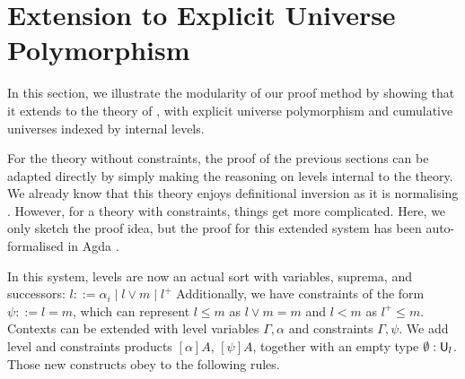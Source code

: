 \section{Extension to Explicit Universe Polymorphism}\label{extension}

In this section, we illustrate the modularity of our proof method by showing that it extends to the theory of \citet{polymorphism, bcde2026}, with explicit universe polymorphism and cumulative universes indexed by internal levels.

For the theory without constraints, the proof of the previous sections can be adapted directly by simply making the reasoning on levels internal to the theory. We already know that this theory enjoys definitional inversion as it is normalising \cite{fuss-free}. However, for a theory with constraints, things get more complicated. Here, we only sketch the proof idea, but the proof for this extended system has been auto-formalised in Agda \cite{auto-formalisation}.

In this system, levels are now an actual sort with variables, suprema, and successors: 
$l ::= \alpha_i \mid l \vee m \mid l^+$
Additionally, we have constraints of the form $\psi ::= l = m$, which can represent $l \leq m$ as $l \vee m = m$ and $l < m$ as $l^+ \leq m$.
Contexts can be extended with level variables $\Gamma, \alpha$ and constraints $\Gamma, \psi$. We add level and constraints products $[\alpha]A$, $[\psi]A$, together with an empty type $\emptyset : \mathsf{U}_l$.
Those new constructs obey to the following rules. 


